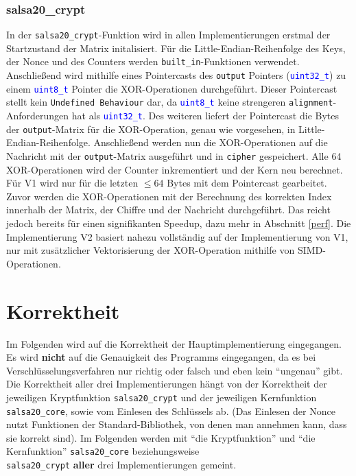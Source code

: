 \documentclass[course=erap]{aspdoc}
\begin{document}
\subsubsection{salsa20\_crypt} \label{crypt}
In der \texttt{salsa20\_crypt}-Funktion wird in allen Implementierungen erstmal der Start\-zustand der Matrix initalisiert. Für die Little-Endian-Reihenfolge des Keys, der Nonce und des Counters werden \texttt{built\_in}-Funktionen verwendet.
Anschließend wird mithilfe eines Pointercasts des \texttt{output} Pointers (\texttt{\textcolor{blue}{uint32\_t}}) zu einem \texttt{\textcolor{blue}{uint8\_t}} Pointer die XOR-Operationen durchgeführt. Dieser Pointercast stellt kein \texttt{Undefined Behaviour} dar, 
da \texttt{\textcolor{blue}{uint8\_t}} keine strengeren \texttt{alignment}-Anforderungen hat als \texttt{\textcolor{blue}{uint32\_t}}. Des weiteren liefert der Pointercast die Bytes der \texttt{output}-Matrix für die XOR-Operation, genau wie vorgesehen, in Little-Endian-Reihenfolge.
Anschließend werden nun die XOR-Operationen auf die Nachricht mit der \texttt{output}-Matrix ausgeführt und in \texttt{cipher} ge\-spei\-chert. Alle 64 XOR-Operationen wird der Counter inkrementiert und der Kern neu berechnet. Für V1 wird nur für die letzten $\leq 64$ Bytes mit dem Pointercast gearbeitet.
Zuvor werden die XOR-Operationen mit der Berechnung des korrekten Index innerhalb der Matrix, der Chiffre und der Nachricht durchgeführt. Das reicht jedoch bereits für einen signifikanten Speedup, dazu mehr in Abschnitt \ref{perf}.
Die Implementierung V2 basiert nahezu vollständig auf der Implementierung von V1, nur mit zusätzlicher Vektorisierung der XOR-Operation mithilfe von SIMD-Operationen.


\section{Korrektheit}
Im Folgenden wird auf die Korrektheit der Hauptimplementierung eingegangen.
Es wird \textbf{nicht} auf die Genauigkeit des Programms eingegangen, da es bei Ver\-schlüsse\-lungsverfahren
nur richtig oder falsch und eben kein ``ungenau'' gibt.
\\
Die Korrektheit aller drei Implementierungen hängt von der Korrektheit der jeweiligen Kryptfunktion \texttt{salsa20\_crypt} 
und der jeweiligen Kernfunktion \texttt{salsa20\_core}, sowie vom Einlesen des Schlüssels ab. (Das Einlesen der Nonce nutzt 
Funktionen der Standard-Bibliothek, von denen man annehmen kann, dass sie korrekt sind). Im Folgenden werden mit ``die Kryptfunktion''
und ``die Kernfunktion'' \texttt{salsa20\_core} beziehungsweise
\\\texttt{salsa20\_crypt} \textbf{aller} drei Implementierungen gemeint.
\end{document}
